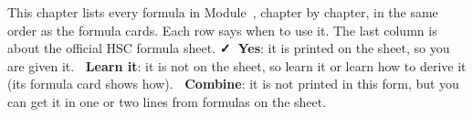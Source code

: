 \label{fs:chap}

\newcommand\fsYes{\textcolor{hscformula}{\footnotesize\bfseries\faCheck\ Yes}}
\newcommand\fsNo{\textcolor{hscmistake}{\footnotesize\bfseries\faTimes\ Learn it}}
\newcommand\fsComb{\textcolor{hsctiptext}{\footnotesize\bfseries\faLink\ Combine}}
\newcommand\fsrow[3]{\rule[-1.6ex]{0pt}{4.7ex}#2 & #3 & #1\\\hline}
\newcommand\fsch[2]{\multicolumn{3}{@{}l@{}}{\rule[-1.2ex]{0pt}{5.2ex}\normalsize
  \cref{#1}: {\bfseries\color{hscbrand}#2}}\\\hline}
\newcommand\fshead{\colhead{Formula} & \colhead{When to use it} & \colhead{On the sheet?}}

This chapter lists every formula in Module~\modulenumber, chapter by chapter, in the same
order as the formula cards. Each row says when to use it. The last column is about the
official HSC formula sheet. \fsYes: it is printed on the sheet, so you are given it.
\fsNo: it is not on the sheet, so learn it or learn how to derive it (its formula card
shows how). \fsComb: it is not printed in this form, but you can get it in one or two lines
from formulas on the sheet.

